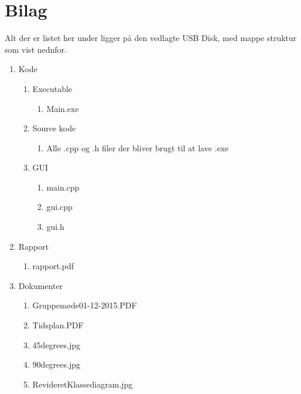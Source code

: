 \appendix
\section{Bilag} \hfill
Alt der er listet her under ligger på den vedlagte USB Disk, med mappe struktur som vist nednfor.
\label{sec:bilag}
\begin{enumerate}[noitemsep]
	\item Kode
	\begin{enumerate}[noitemsep]
		\item Executable
		\begin{enumerate}[noitemsep]
			\item Main.exe
		\end{enumerate}
		\item Source kode
		\begin{enumerate}[noitemsep]
			\item Alle .cpp og .h filer der bliver brugt til at lave .exe
		\end{enumerate}
		\item GUI
		\begin{enumerate}[noitemsep]
			\item main.cpp
			\item gui.cpp
			\item gui.h
		\end{enumerate}
	\end{enumerate}
	\item Rapport
	\begin{enumerate}[noitemsep]
		\item rapport.pdf
	\end{enumerate}
	\item Dokumenter
	\begin{enumerate}[noitemsep]
		\item Gruppemøde01-12-2015.PDF \label{itm:Modereferat1}
		\item Tidsplan.PDF \label{itm:Tidsplan1}
		\item 45degrees.jpg \label{itm:45deg}
		\item 90degrees.jpg \label{itm:90deg}
		\item RevideretKlassediagram.jpg \label{itm:Klassediagramv3}
	\end{enumerate}
\end{enumerate}